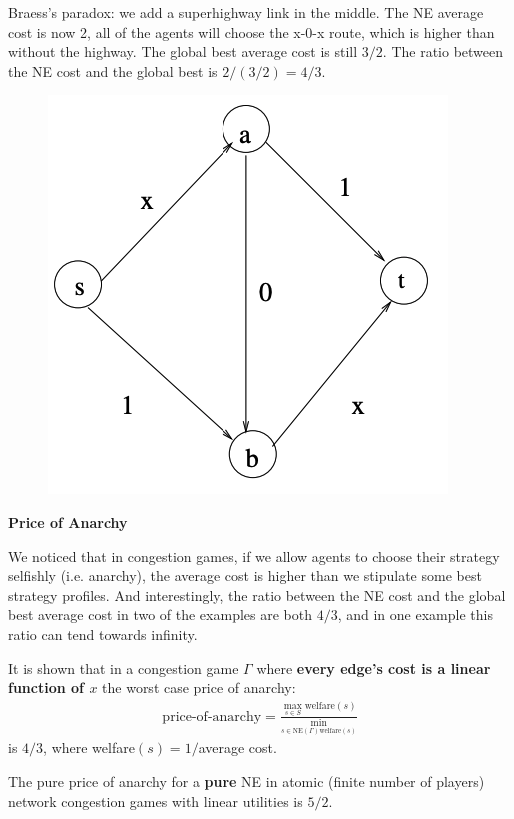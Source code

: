 \documentclass{article}
\begin{document}
Braess’s paradox: we add a superhighway link in the middle. The NE average cost is now 2, all of the agents will choose the x-0-x route, which is higher than without the highway.  The global best average cost is still $3/2$. The ratio between the NE cost and the global best is $2/(3/2) = 4/3$.
\begin{figure}[hbt!]
	\centering
	\includegraphics[width=.35\textwidth]{figs/flow4}
\end{figure}
\newpage
\textbf{Price of Anarchy}

We noticed that in congestion games, if we allow agents to choose their strategy selfishly (i.e. anarchy), the average cost is higher than we stipulate some best strategy profiles. And interestingly, the ratio between the NE cost and the global best average cost in  two of the examples are both $4/3$, and in one example this ratio can tend towards infinity.

It is shown that in a congestion game $\Gamma$ where \textbf{every edge's cost is a linear function of $x$} the worst case price of anarchy:
\begin{align*}
	\text{price-of-anarchy} = \frac{\max_{s \in S} \text{welfare}(s)}{\min_{s \in \text{NE}(\Gamma) \text{welfare}(s)}}
\end{align*}
is $4/3$, where welfare$(s) = 1/$average cost.

The pure price of anarchy for a \textbf{pure} NE in atomic (finite number of players) network congestion games with linear utilities is $5/2$.
\end{document}
